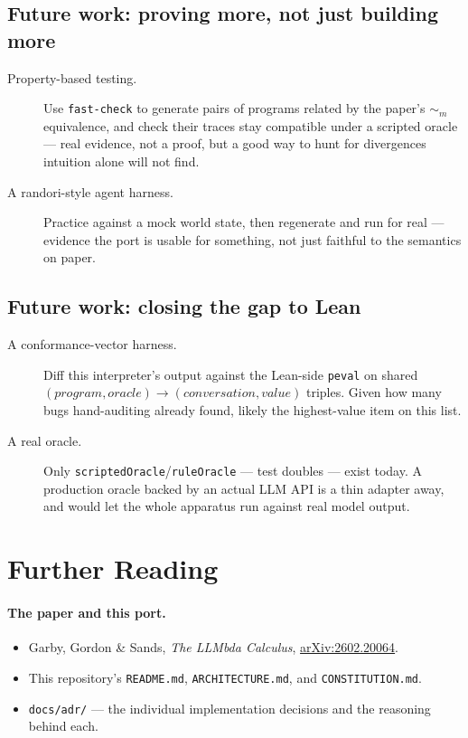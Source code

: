 \documentclass[11pt, a4paper]{article}
\begin{document}
\subsection{Future work: proving more, not just building more}

\begin{description}
  \item[Property-based testing.] Use \texttt{fast-check} to generate
    pairs of programs related by the paper's $\sim_m$ equivalence, and
    check their traces stay compatible under a scripted oracle --- real
    evidence, not a proof, but a good way to hunt for divergences
    intuition alone will not find.
  \item[A randori-style agent harness.] Practice against a mock world
    state, then regenerate and run for real --- evidence the port is
    usable for something, not just faithful to the semantics on paper.
\end{description}

\subsection{Future work: closing the gap to Lean}

\begin{description}
  \item[A conformance-vector harness.] Diff this interpreter's output
    against the Lean-side \texttt{peval} on shared $(\mathit{program},
    \mathit{oracle}) \to (\mathit{conversation}, \mathit{value})$ triples.
    Given how many bugs hand-auditing already found, likely the
    highest-value item on this list.
  \item[A real oracle.] Only \lstinline{scriptedOracle}/\lstinline{ruleOracle}
    --- test doubles --- exist today. A production oracle backed by an
    actual LLM API is a thin adapter away, and would let the whole
    apparatus run against real model output.
\end{description}

\section*{Further Reading}

\paragraph{The paper and this port.}
\begin{itemize}
  \item Garby, Gordon \& Sands, \emph{The LLMbda Calculus},
    \href{https://arxiv.org/abs/2602.20064}{arXiv:2602.20064}.
  \item This repository's \texttt{README.md}, \texttt{ARCHITECTURE.md},
    and \texttt{CONSTITUTION.md}.
  \item \texttt{docs/adr/} --- the individual implementation decisions
    and the reasoning behind each.
\end{itemize}
\end{document}

